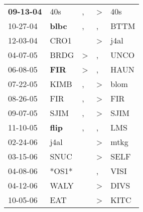 \begin{supertabular}{p{0.07\textwidth}p{0.06\textwidth}p{0.02\textwidth}p{0.02\textwidth}p{0.06\textwidth}}
 \textbf{09-13-04\textsuperscript{}} &            40s\textsuperscript{} &                , &     \textgreater &            40s\textsuperscript{} \\
          10-27-04\textsuperscript{} &  \textbf{blbc\textsuperscript{}} &                , &                , &           BTTM\textsuperscript{} \\
          12-03-04\textsuperscript{} &           CRO1\textsuperscript{} &                  &     \textgreater &           j4al\textsuperscript{} \\
          04-07-05\textsuperscript{} &           BRDG\textsuperscript{} &     \textgreater &                , &           UNCO\textsuperscript{} \\
          06-08-05\textsuperscript{} &   \textbf{FIR\textsuperscript{}} &     \textgreater &                , &           HAUN\textsuperscript{} \\
          07-22-05\textsuperscript{} &           KIMB\textsuperscript{} &                , &     \textgreater &           blom\textsuperscript{} \\
          08-26-05\textsuperscript{} &            FIR\textsuperscript{} &                , &     \textgreater &            FIR\textsuperscript{} \\
          09-07-05\textsuperscript{} &           SJIM\textsuperscript{} &                , &     \textgreater &           SJIM\textsuperscript{} \\
          11-10-05\textsuperscript{} &  \textbf{flip\textsuperscript{}} &                , &                , &            LMS\textsuperscript{} \\
          02-24-06\textsuperscript{} &           j4al\textsuperscript{} &                  &     \textgreater &           mtkg\textsuperscript{} \\
          03-15-06\textsuperscript{} &           SNUC\textsuperscript{} &                  &     \textgreater &           SELF\textsuperscript{} \\
          04-08-06\textsuperscript{} &                            *OS1* &                  &                , &           VISI\textsuperscript{} \\
          04-12-06\textsuperscript{} &           WALY\textsuperscript{} &                  &     \textgreater &           DIVS\textsuperscript{} \\
          10-05-06\textsuperscript{} &            EAT\textsuperscript{} &                  &     \textgreater &           KITC\textsuperscript{} \\

\end{supertabular}

